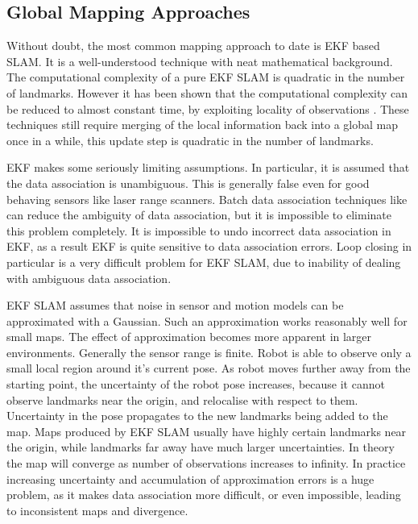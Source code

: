 \subsection{Global Mapping Approaches}


Without doubt, the most common mapping approach to date is EKF based
SLAM. It is a well-understood technique with neat mathematical
background. The computational complexity of a pure EKF SLAM is
quadratic in the number of landmarks. However it has been shown that
the computational complexity can be reduced to almost constant time,
by exploiting locality of observations \cite{Thrun03d,guivant03}.
These techniques still require merging of the local information back
into a global map once in a while, this update step is quadratic in
the number of landmarks.

EKF makes some seriously limiting assumptions. In particular, it is
assumed that the data association is unambiguous. This is generally
false even for good behaving sensors like laser range scanners. Batch
data association techniques like
\cite{neira01:_data_assoc_stoch_mappin_using,
  tardos02:_mappin_local_indoor_envir_using_sonar_data} can reduce the
ambiguity of data association, but it is impossible to eliminate this
problem completely. It is impossible to undo incorrect data
association in EKF, as a result EKF is quite sensitive to data
association errors. Loop closing in particular is a very difficult
problem for EKF SLAM, due to inability of dealing with ambiguous data
association.

EKF SLAM assumes that noise in sensor and motion models can be
approximated with a Gaussian. Such an approximation works reasonably
well for small maps. The effect of approximation becomes more apparent
in larger environments. Generally the sensor range is finite. Robot is
able to observe only a small local region around it's current pose. As
robot moves further away from the starting point, the uncertainty of
the robot pose increases, because it cannot observe landmarks near the
origin, and relocalise with respect to them. Uncertainty in the pose
propagates to the new landmarks being added to the map. Maps produced
by EKF SLAM usually have highly certain landmarks near the origin,
while landmarks far away have much larger uncertainties. In theory the
map will converge as number of observations increases to infinity. In
practice increasing uncertainty and accumulation of approximation
errors is a huge problem, as it makes data association more difficult,
or even impossible, leading to inconsistent maps and divergence.



